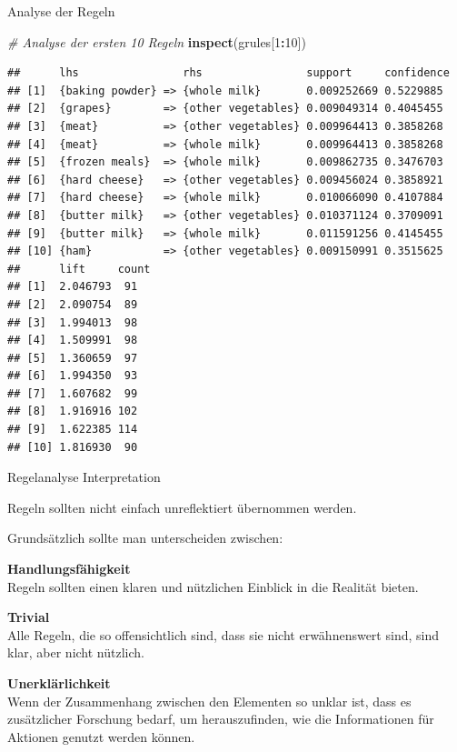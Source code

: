 \documentclass[12pt,ngerman,a4paper,ignorenonframetext,]{beamer}
\newenvironment{Shaded}{\begin{snugshade}}{\end{snugshade}}
\newcommand{\CommentTok}[1]{\textcolor[rgb]{0.56,0.35,0.01}{\textit{#1}}}
\newcommand{\DecValTok}[1]{\textcolor[rgb]{0.00,0.00,0.81}{#1}}
\newcommand{\KeywordTok}[1]{\textcolor[rgb]{0.13,0.29,0.53}{\textbf{#1}}}
\newcommand{\NormalTok}[1]{#1}
\newcommand{\OperatorTok}[1]{\textcolor[rgb]{0.81,0.36,0.00}{\textbf{#1}}}
\begin{document}
\begin{frame}{Analyse der Regeln}
\protect\hypertarget{analyse-der-regeln}{}

\begin{Shaded}
\begin{Highlighting}[]
\CommentTok{# Analyse der ersten 10 Regeln}
\KeywordTok{inspect}\NormalTok{(grules[}\DecValTok{1}\OperatorTok{:}\DecValTok{10}\NormalTok{])}
\end{Highlighting}
\end{Shaded}

\begin{verbatim}
##      lhs                rhs                support     confidence
## [1]  {baking powder} => {whole milk}       0.009252669 0.5229885 
## [2]  {grapes}        => {other vegetables} 0.009049314 0.4045455 
## [3]  {meat}          => {other vegetables} 0.009964413 0.3858268 
## [4]  {meat}          => {whole milk}       0.009964413 0.3858268 
## [5]  {frozen meals}  => {whole milk}       0.009862735 0.3476703 
## [6]  {hard cheese}   => {other vegetables} 0.009456024 0.3858921 
## [7]  {hard cheese}   => {whole milk}       0.010066090 0.4107884 
## [8]  {butter milk}   => {other vegetables} 0.010371124 0.3709091 
## [9]  {butter milk}   => {whole milk}       0.011591256 0.4145455 
## [10] {ham}           => {other vegetables} 0.009150991 0.3515625 
##      lift     count
## [1]  2.046793  91  
## [2]  2.090754  89  
## [3]  1.994013  98  
## [4]  1.509991  98  
## [5]  1.360659  97  
## [6]  1.994350  93  
## [7]  1.607682  99  
## [8]  1.916916 102  
## [9]  1.622385 114  
## [10] 1.816930  90
\end{verbatim}

\end{frame}

\begin{frame}{Regelanalyse Interpretation}
\protect\hypertarget{regelanalyse-interpretation}{}

Regeln sollten nicht einfach unreflektiert übernommen werden.

Grundsätzlich sollte man unterscheiden zwischen:

\textbf{Handlungsfähigkeit}\\
Regeln sollten einen klaren und nützlichen Einblick in die Realität
bieten.

\textbf{Trivial}\\
Alle Regeln, die so offensichtlich sind, dass sie nicht erwähnenswert
sind, sind klar, aber nicht nützlich.

\textbf{Unerklärlichkeit}\\
Wenn der Zusammenhang zwischen den Elementen so unklar ist, dass es
zusätzlicher Forschung bedarf, um herauszufinden, wie die Informationen
für Aktionen genutzt werden können.

\end{frame}
\end{document}
